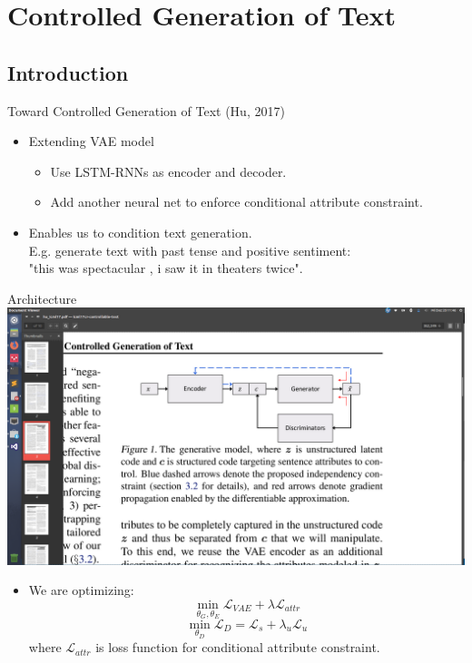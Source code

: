 \documentclass{beamer}
\begin{document}
    \section{Controlled Generation of Text}

    \subsection{Introduction}

    \begin{frame}{Toward Controlled Generation of Text (Hu, 2017)}

        \begin{itemize}
            \item Extending VAE model
            \begin{itemize}
                \item Use LSTM-RNNs as encoder and decoder.
                \item Add another neural net to enforce conditional attribute constraint.
            \end{itemize}
            \item Enables us to condition text generation. \\E.g. generate text with past tense and positive sentiment: \\"this was spectacular , i saw it in theaters twice".
        \end{itemize}

    \end{frame}

    \begin{frame}{Architecture}
        \includegraphics{architecture}
        \begin{itemize}
            \item We are optimizing:
            $$\min_{\theta_G, \theta_E} \mathcal{L}_{VAE} + \lambda \mathcal{L}_{attr}$$
            $$\min_{\theta_{D}} \mathcal{L}_D = \mathcal{L}_s + \lambda_u \mathcal{L}_u $$
            where $\mathcal{L}_{attr}$ is loss function for conditional attribute constraint.
        \end{itemize}
    \end{frame}
\end{document}
